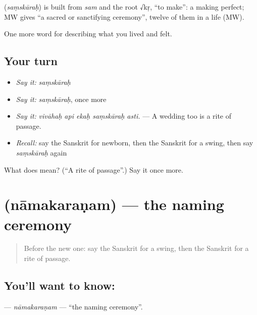 \begin{cousinweb}
\textbf{} (\emph{saṃskāraḥ}) is built from \emph{sam} and the root √kṛ, \textquotedblleft{}to make\textquotedblright{}: a making perfect; MW gives \textquotedblleft{}a sacred or sanctifying ceremony\textquotedblright{}, twelve of them in a life (MW).
\end{cousinweb}

\begin{grammarlens}[title={What you've built}]
One more word for describing what you lived and felt.
\end{grammarlens}

\subsection*{Your turn}
\begin{itemize}
\raggedright
  \item \emph{Say it:} \emph{saṃskāraḥ}
  \item \emph{Say it:} \emph{saṃskāraḥ}, once more
  \item \emph{Say it:} \emph{vivāhaḥ api ekaḥ saṃskāraḥ asti.} — A wedding too is a rite of passage.
  \item \emph{Recall:} say the Sanskrit for newborn, then the Sanskrit for a swing, then say \emph{saṃskāraḥ} again
\end{itemize}

\begin{tcolorbox}[breakable,colback=teal!4,colframe=teal!35!black,title={Before you move on}]
What does  mean? (\textquotedblleft{}A rite of passage\textquotedblright{}.) Say it once more.
\end{tcolorbox}
\section[\texorpdfstring{\sk{नामकरणम्} (nāmakaraṇam)}{नामकरणम् (nāmakaraṇam)}]{ (nāmakaraṇam) — the naming ceremony}

\label{lesson:SA-C493-namakaranam}



\begin{quote}
Before the new one: say the Sanskrit for a swing, then the Sanskrit for a rite of passage.
\end{quote}

\subsection*{You'll want to know: }
\textbf{} — \emph{nāmakaraṇam} — \textquotedblleft{}the naming ceremony\textquotedblright{}.

